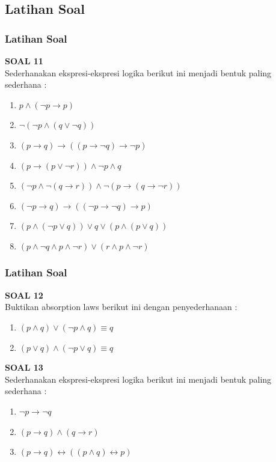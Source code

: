 \documentclass[handout]{beamer}
\theoremstyle{definition}
\theoremstyle{example}
\begin{document}
\subsection{Latihan Soal}
\begin{frame}
	\frametitle{Latihan Soal}
	\textbf{SOAL 11}\\
	Sederhanakan ekspresi-ekspresi logika berikut ini menjadi bentuk paling sederhana :\\
	\begin{enumerate}
		\item $ p \wedge (\neg p \rightarrow p) $
		\item $\neg (\neg p \wedge (q\vee \neg q))$
		\item $(p \rightarrow q)\rightarrow((p \rightarrow \neg q)\rightarrow \neg p)$	
		\item $(p \rightarrow(p \vee \neg r))\wedge \neg p \wedge q$
		\item $(\neg p \wedge \neg (q \rightarrow r))\wedge \neg (p \rightarrow (q \rightarrow \neg r)) $
		\item $(\neg p \rightarrow q)\rightarrow ((\neg p \rightarrow \neg q)\rightarrow p)$
		\item $(p \wedge (\neg p \vee q))\vee q \vee (p \wedge (p \vee q)) $
		\item $(p \wedge \neg q \wedge p \wedge \neg r)\vee (r \wedge p \wedge \neg r) $	
	\end{enumerate}	
\end{frame}


\begin{frame}
	\frametitle{Latihan Soal}
	\textbf{SOAL 12}\\
	Buktikan absorption laws berikut ini dengan penyederhanaan :\\
	\begin{enumerate}
		\item $ (p \wedge q)\vee(\neg p \wedge q) \equiv q $
		\item $ (p \vee q)\wedge(\neg p \vee q) \equiv q $
	\end{enumerate}	
	\textbf{SOAL 13}\\
	Sederhanakan ekspresi-ekspresi logika berikut ini menjadi bentuk paling sederhana :\\
	\begin{enumerate}
		\item $ \neg p \rightarrow \neg q $
		\item $(p \rightarrow q) \wedge (q \rightarrow r)$	
		\item $(p \rightarrow q)\leftrightarrow ((p \wedge q) \leftrightarrow p)$	
	\end{enumerate}
\end{frame}
\end{document}
